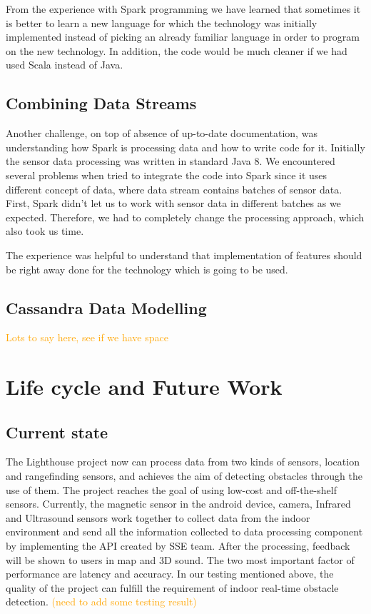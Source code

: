 \documentclass[prodmode,acmtosem]{acmsmall} %
\begin{document}
From the experience with Spark programming we have learned that sometimes it is better to learn a new language for which the technology was initially implemented instead of picking an already familiar language in order to program on the new technology. In addition, the code would be much cleaner if we had used Scala instead of Java.

\subsection{Combining Data Streams}
Another challenge, on top of absence of up-to-date documentation, was understanding how Spark is processing data and how to write code for it. Initially the sensor data processing was written in standard Java 8. We encountered several problems when tried to integrate the code into Spark since it uses different concept of data, where data stream contains batches of sensor data. First, Spark didn't let us to work with sensor data in different batches as we expected. Therefore, we had to completely change the processing approach, which also took us time.

The experience was helpful to understand that implementation of features should be right away done for the technology which is going to be used.

\subsection{Cassandra Data Modelling}
\textcolor{orange}{Lots to say here, see if we have space}

\section{Life cycle and Future Work}
\subsection{Current state}
\label{sec:current}
The Lighthouse project now can process data from two kinds of sensors, location and rangefinding sensors, and achieves the aim of detecting obstacles through the use of them. The project reaches the goal of using low-cost and off-the-shelf sensors. Currently, the magnetic sensor in the android device, camera, Infrared and Ultrasound sensors work together to collect data from the indoor environment and send all the information collected to data processing component by implementing the API created by SSE team. After the processing, feedback will be shown to users in map and 3D sound. The two most important factor of performance are latency and accuracy. In our testing mentioned above, the quality of the project can fulfill the requirement of indoor real-time obstacle detection.
\textcolor{orange}{(need to add some testing result)}
\end{document}
